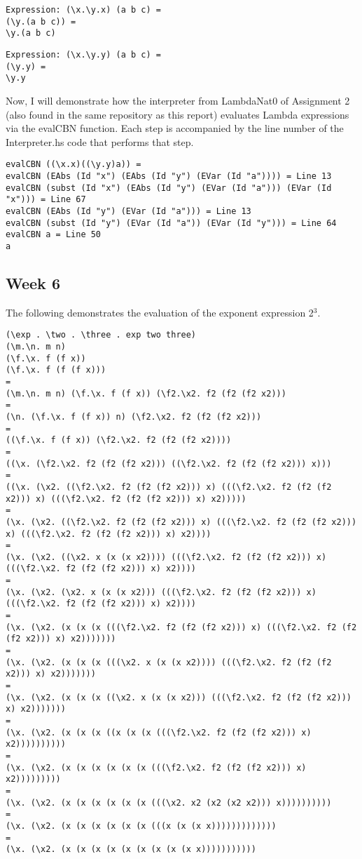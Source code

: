\documentclass{article}
\theoremstyle{theorem}
\theoremstyle{definition}
\theoremstyle{remark}
\begin{document}
\begin{lstlisting}
Expression: (\x.\y.x) (a b c) =
(\y.(a b c)) =
\y.(a b c)
\end{lstlisting}

\begin{lstlisting}
Expression: (\x.\y.y) (a b c) =
(\y.y) =
\y.y
\end{lstlisting}
%
Now, I will demonstrate how the interpreter from LambdaNat0 of Assignment 2 (also found in the same repository as this report) evaluates Lambda expressions via the evalCBN function. Each step is accompanied by the line number of the Interpreter.hs code that performs that step.

\begin{lstlisting}
evalCBN ((\x.x)((\y.y)a)) = 
evalCBN (EAbs (Id "x") (EAbs (Id "y") (EVar (Id "a")))) = Line 13
evalCBN (subst (Id "x") (EAbs (Id "y") (EVar (Id "a"))) (EVar (Id "x"))) = Line 67
evalCBN (EAbs (Id "y") (EVar (Id "a"))) = Line 13
evalCBN (subst (Id "y") (EVar (Id "a")) (EVar (Id "y"))) = Line 64
evalCBN a = Line 50
a
\end{lstlisting}

\subsection{Week 6}

The following demonstrates the evaluation of the exponent expression 2$^3$.

\begin{lstlisting}
(\exp . \two . \three . exp two three)
(\m.\n. m n)
(\f.\x. f (f x))
(\f.\x. f (f (f x)))
=
(\m.\n. m n) (\f.\x. f (f x)) (\f2.\x2. f2 (f2 (f2 x2)))
=
(\n. (\f.\x. f (f x)) n) (\f2.\x2. f2 (f2 (f2 x2)))
=
((\f.\x. f (f x)) (\f2.\x2. f2 (f2 (f2 x2))))
=
((\x. (\f2.\x2. f2 (f2 (f2 x2))) ((\f2.\x2. f2 (f2 (f2 x2))) x)))
=
((\x. (\x2. ((\f2.\x2. f2 (f2 (f2 x2))) x) (((\f2.\x2. f2 (f2 (f2 x2))) x) (((\f2.\x2. f2 (f2 (f2 x2))) x) x2)))))
=
(\x. (\x2. ((\f2.\x2. f2 (f2 (f2 x2))) x) (((\f2.\x2. f2 (f2 (f2 x2))) x) (((\f2.\x2. f2 (f2 (f2 x2))) x) x2))))
=
(\x. (\x2. ((\x2. x (x (x x2)))) (((\f2.\x2. f2 (f2 (f2 x2))) x) (((\f2.\x2. f2 (f2 (f2 x2))) x) x2))))
=
(\x. (\x2. (\x2. x (x (x x2))) (((\f2.\x2. f2 (f2 (f2 x2))) x) (((\f2.\x2. f2 (f2 (f2 x2))) x) x2))))
=
(\x. (\x2. (x (x (x (((\f2.\x2. f2 (f2 (f2 x2))) x) (((\f2.\x2. f2 (f2 (f2 x2))) x) x2)))))))
=
(\x. (\x2. (x (x (x (((\x2. x (x (x x2)))) (((\f2.\x2. f2 (f2 (f2 x2))) x) x2)))))))
=
(\x. (\x2. (x (x (x ((\x2. x (x (x x2))) (((\f2.\x2. f2 (f2 (f2 x2))) x) x2)))))))
=
(\x. (\x2. (x (x (x ((x (x (x (((\f2.\x2. f2 (f2 (f2 x2))) x) x2))))))))))
=
(\x. (\x2. (x (x (x (x (x (x (((\f2.\x2. f2 (f2 (f2 x2))) x) x2)))))))))
=
(\x. (\x2. (x (x (x (x (x (x (((\x2. x2 (x2 (x2 x2))) x))))))))))
=
(\x. (\x2. (x (x (x (x (x (x (((x (x (x x)))))))))))))
=
(\x. (\x2. (x (x (x (x (x (x (x (x (x x)))))))))))
\end{lstlisting}
\end{document}

